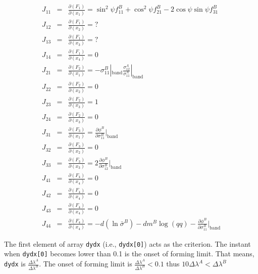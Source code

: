 \documentclass[12pt]{amsart}
\begin{document}
\begin{eqnarray}
  \label{eq:jacob_func_fld1}
  J_{11}&=&\frac{\partial(F_1)}{\partial(x_1)}= \sin^2\psi f^B_{11}+\cos^2\psi f^B_{21}-2\cos\psi\sin\psi f^B_{31}\\
  J_{12}&=&\frac{\partial(F_1)}{\partial(x_2)}= ?\nonumber \\
  J_{13}&=&\frac{\partial(F_1)}{\partial(x_3)}= ?\nonumber\\
  J_{14}&=&\frac{\partial(F_1)}{\partial(x_4)}=0  \nonumber\\
  J_{21}&=&\frac{\partial(F_2)}{\partial(x_1)}=-\sigma_{11}^B|_\text{band} \frac{\sigma_{12}^A}{\sigma_{11}^A}|_\text{band}  \nonumber\\
  J_{22}&=&\frac{\partial(F_2)}{\partial(x_2)}=0  \nonumber\\
  J_{23}&=&\frac{\partial(F_2)}{\partial(x_3)}=1  \nonumber\\
  J_{24}&=&\frac{\partial(F_2)}{\partial(x_3)}=0  \nonumber\\
  J_{31}&=&\frac{\partial(F_3)}{\partial(x_1)}=\frac{\partial \phi^B}{\partial \sigma^B_{11}}|_\text{band}    \nonumber\\
  J_{32}&=&\frac{\partial(F_3)}{\partial(x_2)}=0  \nonumber\\
  J_{33}&=&\frac{\partial(F_3)}{\partial(x_3)}=2 \frac{\partial \phi^B}{\partial \sigma^B_{12}}|_\text{band}  \nonumber\\
  J_{41}&=&\frac{\partial(F_4)}{\partial(x_4)}=0 \nonumber\\
  J_{42}&=&\frac{\partial(F_4)}{\partial(x_4)}=0\nonumber\\
  J_{43}&=&\frac{\partial(F_4)}{\partial(x_4)}=0\nonumber\\
  J_{44}&=&\frac{\partial(F_4)}{\partial(x_4)}=-d(\ln{\bar{\sigma}^B}) - dm^B \log(qq)-\frac{\partial \phi^B}{\partial \sigma^B_{11}}|_\text{band}\nonumber
\end{eqnarray}


The first element of array \verb|dydx| (i.e., \verb|dydx[0]|) acts as the criterion.
The instant when \verb|dydx[0]| becomes lower than 0.1 is the onset of forming limit.
That means, \verb|dydx| is $\frac{\Delta\lambda^A}{\Delta\lambda^B}$.
The onset of forming limit is $\frac{\Delta\lambda^A}{\Delta\lambda^B}<0.1$ thus $10 \Delta\lambda^A<\Delta\lambda^B$
\end{document}
